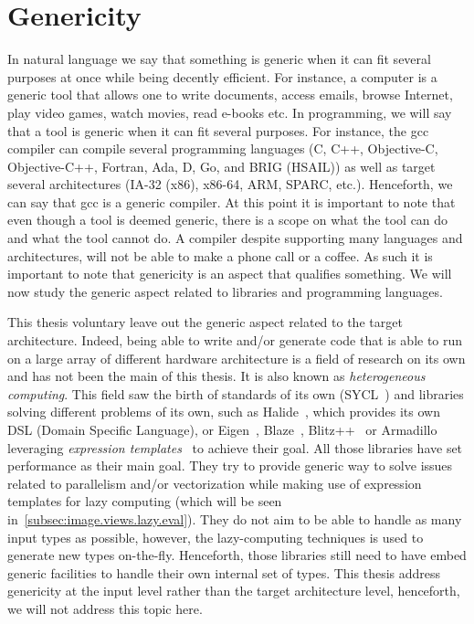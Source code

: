 \chapter{Genericity}
\label{chap:genericity}

In natural language we say that something is generic when it can fit several purposes at once while being decently
efficient. For instance, a computer is a generic tool that allows one to write documents, access emails, browse
Internet, play video games, watch movies, read e-books etc. In programming, we will say that a tool is generic when it
can fit several purposes. For instance, the gcc compiler can compile several programming languages (C, C++, Objective-C,
Objective-C++, Fortran, Ada, D, Go, and BRIG (HSAIL)) as well as target several architectures (IA-32 (x86), x86-64, ARM,
SPARC, etc.). Henceforth, we can say that gcc is a generic compiler. At this point it is important to note that even
though a tool is deemed generic, there is a scope on what the tool can do and what the tool cannot do. A compiler
despite supporting many languages and architectures, will not be able to make a phone call or a coffee. As such it is
important to note that genericity is an aspect that qualifies something. We will now study the generic aspect related to
libraries and programming languages.

This thesis voluntary leave out the generic aspect related to the target architecture. Indeed, being able to write
and/or generate code that is able to run on a large array of different hardware architecture is a field of research on
its own and has not been the main of this thesis. It is also known as \emph{heterogeneous computing}. This field saw the
birth of standards of its own (SYCL~\parencite{brown.2019.heterogeneous,wong.2019.heterogeneous}) and libraries solving
different problems of its own, such as Halide~\parencite{ragankelley.2013.halide}, which provides its own DSL (Domain
Specific Language), or Eigen~\cite{guennebaud.2010.eigen}, Blaze~\cite{iglberger.2012.blaze,iglberger.2012_1.blaze},
Blitz++~\cite{veldhuizen.2000.blitz} or Armadillo~\cite{sanderson.2016.armadillo} leveraging \emph{expression
  templates}~\cite{veldhuizen.1995.expression} to achieve their goal. All those libraries have set performance as their
main goal. They try to provide generic way to solve issues related to parallelism and/or vectorization while making use
of expression templates for lazy computing (which will be seen in~\cref{subsec:image.views.lazy.eval}). They do not aim
to be able to handle as many input types as possible, however, the lazy-computing techniques is used to generate new
types on-the-fly. Henceforth, those libraries still need to have embed generic facilities to handle their own internal
set of types. This thesis address genericity at the input level rather than the target architecture level, henceforth,
we will not address this topic here.

